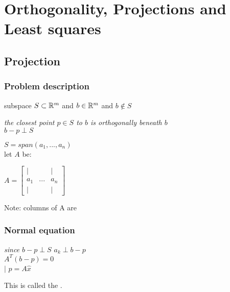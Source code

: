 \section{Orthogonality, Projections and Least squares}

\subsection{Projection}
\subsubsection*{Problem description}
subspace $S \subset \mathbb{R}^m$ 
and $b \in \mathbb{R}^m$ and $b \notin S$ 

\begin{center}
\color{blue}
\textit{the closest point $p \in S$ to $b$  is orthogonally beneath $b$} \\
\textit{ $b - p \perp S$}
\end{center}

$S = span(a_1, ..., a_n)$ \\

let $A$ be: \\

\begin{center}
$A =  
\begin{bmatrix}
 | &  & | \\
 a_1 & ... & a_n \\
 | &  & | 
\end{bmatrix}
$
\end{center}

Note: columns of A are 

\subsubsection*{Normal equation}

\begin{center}
\textit{since $b - p \perp S$ \imp $a_k \perp b - p$} \\ 

\imp $A^T  (b - p) = 0$ \\

\myeq {} \hsp $|$ \hsp $p = A\hat{x}$

\end{center}

This is called the . \\

